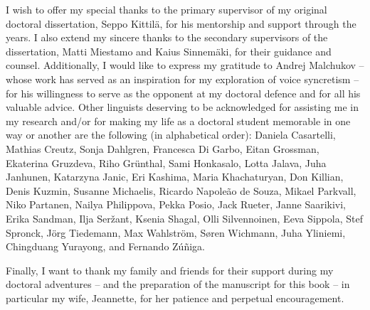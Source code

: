 \addchap{\lsAcknowledgementTitle} 
I wish to offer my special thanks to the primary supervisor of my original doctoral dissertation, Seppo Kittilä, for his mentorship and support through the years. I also extend my sincere thanks to the secondary supervisors of the dissertation, Matti Miestamo and Kaius Sinnemäki, for their guidance and counsel. Additionally, I would like to express my gratitude to Andrej Malchukov -- whose work has served as an inspiration for my exploration of voice syncretism -- for his willingness to serve as the opponent at my doctoral defence and for all his valuable advice. Other linguists deserving to be acknowledged for assisting me in my research and/or for making my life as a doctoral student memorable in one way or another are the following (in alphabetical order): Daniela Casartelli, Mathias Creutz, Sonja Dahlgren, Francesca Di Garbo, Eitan Grossman, Ekaterina Gruzdeva, Riho Grünthal, Sami Honkasalo, Lotta Jalava, Juha Janhunen, Katarzyna Janic, Eri Kashima, Maria Khachaturyan, Don Killian, Denis Kuzmin, Susanne Michaelis, Ricardo Napoleão de Souza, Mikael Parkvall, Niko Partanen, Nailya Philippova, Pekka Posio, Jack Rueter, Janne Saarikivi, Erika Sandman, Ilja Seržant, Ksenia Shagal, Olli Silvennoinen, Eeva Sippola, Stef Spronck, Jörg Tiedemann, Max Wahlström, Søren Wichmann, Juha Yliniemi, Chingduang Yurayong, and Fernando Zúñiga.

Finally, I want to thank my family and friends for their support during my doctoral adventures -- and the preparation of the manuscript for this book -- in particular my wife, Jeannette, for her patience and perpetual encouragement. 